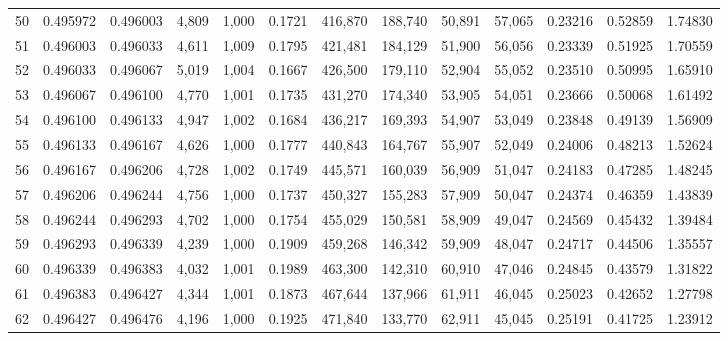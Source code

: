 \begin{tabular}{rrrrrrrrrrrrr}
50  &  0.495972 &  0.496003 &   4,809 &  1,000 &                                     0.1721 &  416,870 &  188,740 &   50,891 &   57,065 &  0.23216 &  0.52859 &  1.74830 \\
51  &  0.496003 &  0.496033 &   4,611 &  1,009 &                                     0.1795 &  421,481 &  184,129 &   51,900 &   56,056 &  0.23339 &  0.51925 &  1.70559 \\
52  &  0.496033 &  0.496067 &   5,019 &  1,004 &                                     0.1667 &  426,500 &  179,110 &   52,904 &   55,052 &  0.23510 &  0.50995 &  1.65910 \\
53  &  0.496067 &  0.496100 &   4,770 &  1,001 &                                     0.1735 &  431,270 &  174,340 &   53,905 &   54,051 &  0.23666 &  0.50068 &  1.61492 \\
54  &  0.496100 &  0.496133 &   4,947 &  1,002 &                                     0.1684 &  436,217 &  169,393 &   54,907 &   53,049 &  0.23848 &  0.49139 &  1.56909 \\
55  &  0.496133 &  0.496167 &   4,626 &  1,000 &                                     0.1777 &  440,843 &  164,767 &   55,907 &   52,049 &  0.24006 &  0.48213 &  1.52624 \\
56  &  0.496167 &  0.496206 &   4,728 &  1,002 &                                     0.1749 &  445,571 &  160,039 &   56,909 &   51,047 &  0.24183 &  0.47285 &  1.48245 \\
57  &  0.496206 &  0.496244 &   4,756 &  1,000 &                                     0.1737 &  450,327 &  155,283 &   57,909 &   50,047 &  0.24374 &  0.46359 &  1.43839 \\
58  &  0.496244 &  0.496293 &   4,702 &  1,000 &                                     0.1754 &  455,029 &  150,581 &   58,909 &   49,047 &  0.24569 &  0.45432 &  1.39484 \\
59  &  0.496293 &  0.496339 &   4,239 &  1,000 &                                     0.1909 &  459,268 &  146,342 &   59,909 &   48,047 &  0.24717 &  0.44506 &  1.35557 \\
60  &  0.496339 &  0.496383 &   4,032 &  1,001 &                                     0.1989 &  463,300 &  142,310 &   60,910 &   47,046 &  0.24845 &  0.43579 &  1.31822 \\
61  &  0.496383 &  0.496427 &   4,344 &  1,001 &                                     0.1873 &  467,644 &  137,966 &   61,911 &   46,045 &  0.25023 &  0.42652 &  1.27798 \\
62  &  0.496427 &  0.496476 &   4,196 &  1,000 &                                     0.1925 &  471,840 &  133,770 &   62,911 &   45,045 &  0.25191 &  0.41725 &  1.23912 \\

\end{tabular}
